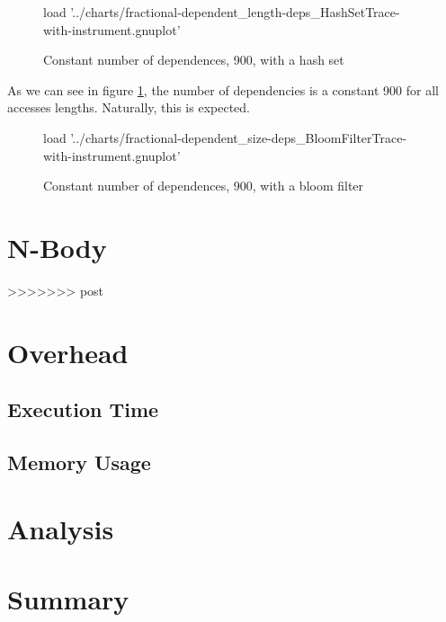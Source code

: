 \begin{figure}[H]
	\centering
	\begin{gnuplot}[terminal=pdf]
		load '../charts/fractional-dependent_length-deps_HashSetTrace-with-instrument.gnuplot'
	\end{gnuplot}
	\caption{Constant number of dependences, 900, with a hash set}
	\label{chart:fractional-constant-900-hashset}
\end{figure}

As we can see in figure \ref{chart:fractional-constant-900-hashset}, the number of dependencies is a constant 900 for all accesses lengths. Naturally, this is expected.

\begin{figure}[H]
	\centering
	\begin{gnuplot}[terminal=pdf]
		load '../charts/fractional-dependent_size-deps_BloomFilterTrace-with-instrument.gnuplot'
	\end{gnuplot}
	\caption{Constant number of dependences, 900, with a bloom filter}
	\label{chart:fractional-constant-900-bloomfilter}
\end{figure}

\section{N-Body} \label{sec:results/nbody}

>>>>>>> post
\section{Overhead} \label{sec:results/overhead}
	\subsection{Execution Time} \label{sec:results/overhead/time}
	
	\subsection{Memory Usage} \label{sec:results/overhead/memory}

\section{Analysis} \label{sec:results/analysis}

\section{Summary} \label{sec:results/summary}